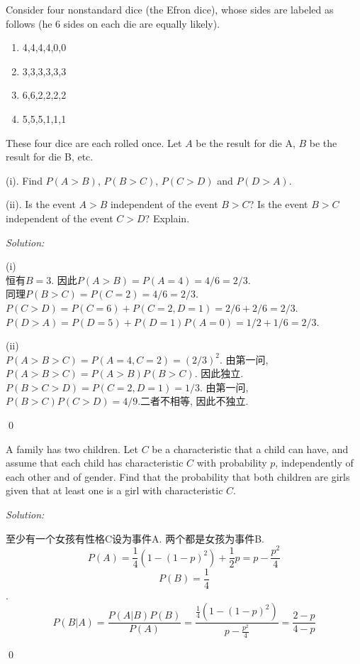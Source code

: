 \documentclass[12pt]{article}
\newenvironment{problem}[2][Problem]{\begin{trivlist}
\item[\hskip \labelsep {\bfseries #1}\hskip \labelsep {\bfseries #2.}]}{\end{trivlist}}
\newenvironment{sol}
    {\emph{Solution:}
    }
    {
    \qed
    }
\newcommand{\f}[2]{\frac{#1}{#2}}                                      %
\newcommand{\ff}[1]{\frac{1}{#1}}                                      %
\begin{document}
\begin{problem}{8}
Consider four nonstandard dice (the Efron dice), whose sides are labeled as follows (he 6 sides on each die
are equally likely).
\begin{enumerate}
    \item[A:] 4,4,4,4,0,0
    \item[B:] 3,3,3,3,3,3
    \item[C:] 6,6,2,2,2,2
    \item[D:] 5,5,5,1,1,1
\end{enumerate}
These four dice are each rolled once. Let $A$ be the result for die A, $B$ be the result for die B, etc.

(i). Find $P(A>B)$, $P(B>C)$, $P(C>D)$ and $P(D>A)$.

(ii). Is the event $A>B$ independent of the event $B>C$? Is the event $B>C$ independent of the event $C>D$? Explain.
\end{problem}
\begin{sol}

    (i)\\
恒有$B=3$. 因此$P(A>B)= P(A=4)= 4/6=2/3$. \\
同理$P(B>C)= P(C=2)= 4/6=2/3$.\\
$P(C>D) = P(C=6) + P(C=2,D=1) = 2/6+2/6=2/3$.\\
$P(D>A) = P(D=5) + P(D=1)P(A=0) = 1/2+1/6 = 2/3$.

    (ii)\\
$P(A>B>C) = P(A=4,C=2)=(2/3)^2$. 由第一问, $P(A>B>C)=P(A>B)P(B>C)$. 因此独立. \\
$P(B>C>D) = P(C=2,D=1) = 1/3$. 由第一问, $P(B>C)P(C>D)=4/9$.二者不相等, 因此不独立. 
\end{sol}



\begin{problem}{9}
A family has two children. Let $C$ be a characteristic that a child can have, and assume that each child has
characteristic $C$ with probability $p$, independently of each other and of gender. Find that the probability that both children are girls
given that at least one is a girl with characteristic $C$.
\end{problem}
\begin{sol}
至少有一个女孩有性格C设为事件A. 两个都是女孩为事件B. 
$$P(A) = \ff{4}(1-(1-p)^2) + \ff{2}p = p-\f{p^2}{4}$$
$$P(B) = \ff{4}$$.
$$P(B|A) = \f{P(A|B)P(B)}{P(A)} = \f{\ff{4}(1-(1-p)^2)}{p-\f{p^2}{4}} = \f{2-p}{4-p}$$
\end{sol}
\end{document}
